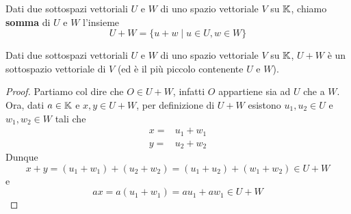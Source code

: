 \begin{definition}
	Dati due sottospazi vettoriali $U$ e $W$ di uno spazio vettoriale $V$ su $\mathbb{K}$, chiamo \textbf{somma}
	di $U$ e $W$ l'insieme
	\[ U + W = \{u + w \mid u \in U, w \in W\} \]
\end{definition}

\begin{proposition}
	Dati due sottospazi vettoriali $U$ e $W$ di uno spazio vettoriale $V$ su $\mathbb{K}$, $U + W$ è un
	sottospazio vettoriale di $V$ (ed è il più piccolo contenente $U$ e $W$).
	\begin{proof}
		Partiamo col dire che $O \in U + W$, infatti $O$ appartiene sia ad $U$ che a $W$. Ora, dati
		$a \in \mathbb{K}$ e $x, y \in U + W$, per definizione di $U + W$ esistono $u_1, u_2 \in U$ e
		$w_1, w_2 \in W$ tali che
		\begin{align*}
			x = & u_1 + w_1 \\ y = & u_2 + w_2
		\end{align*}
		Dunque
		\[ x + y = (u_1 + w_1) + (u_2 + w_2) = (u_1 + u_2) + (w_1 + w_2) \in U + W \]
		e
		\[ ax = a(u_1 + w_1) = au_1 + aw_1 \in U + W \]
	\end{proof}
\end{proposition}
